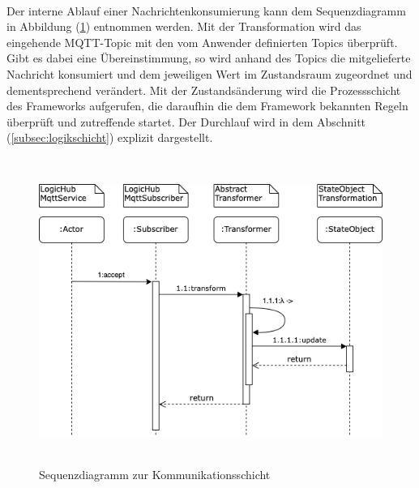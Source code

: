     \\
    Der interne Ablauf einer Nachrichtenkonsumierung kann dem Sequenzdiagramm in Abbildung (\ref{fig:kommunikationsequenz}) entnommen werden. Mit der Transformation 
    wird das eingehende \acs{MQTT}-Topic mit den vom Anwender definierten Topics überprüft. Gibt es dabei eine Übereinstimmung, so wird anhand des Topics die mitgelieferte 
    Nachricht konsumiert und dem jeweiligen Wert im Zustandsraum zugeordnet und dementsprechend verändert. Mit der Zustandsänderung wird die 
    Prozessschicht des Frameworks aufgerufen, die daraufhin die dem Framework bekannten Regeln überprüft und zutreffende startet. Der Durchlauf wird in dem Abschnitt (\ref{subsec:logikschicht}) 
    explizit dargestellt. 
    \begin{figure}[hbt!]
        \centering
        \includegraphics[width=14cm,height=10cm,keepaspectratio]{images/Kommunikationsschicht_Sequenz_Final.png}
        \caption{Sequenzdiagramm zur Kommunikationsschicht}
        \label{fig:kommunikationsequenz}
    \end{figure}
